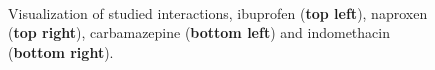 \begin{figure}[htb]
	\centering
	\\
	\caption{Visualization of studied interactions, ibuprofen (\textbf{top left}), naproxen (\textbf{top right}), carbamazepine (\textbf{bottom left}) and indomethacin (\textbf{bottom right}).}
	\label{fig:nap_int}    
\end{figure}




